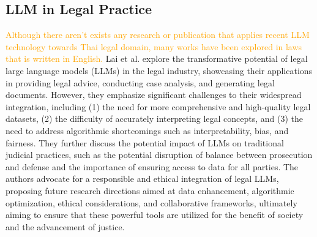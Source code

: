 
\subsection{LLM in Legal Practice}
\label{sec:llminlegal}

\textcolor{orange}{Although there aren't exists any research or publication that applies recent LLM technology towards Thai legal domain, many works have been explored in laws that is written in English.} Lai et al. \cite{LLMlawsurvey} explore the transformative potential of legal large language models (LLMs) in the legal industry, showcasing their applications in providing legal advice, conducting case analysis, and generating legal documents. However, they emphasize significant challenges to their widespread integration, including (1) the need for more comprehensive and high-quality legal datasets, (2) the difficulty of accurately interpreting legal concepts, and (3) the need to address algorithmic shortcomings such as interpretability, bias, and fairness. They further discuss the potential impact of LLMs on traditional judicial practices, such as the potential disruption of balance between prosecution and defense and the importance of ensuring access to data for all parties. The authors advocate for a responsible and ethical integration of legal LLMs, proposing future research directions aimed at data enhancement, algorithmic optimization, ethical considerations, and collaborative frameworks, ultimately aiming to ensure that these powerful tools are utilized for the benefit of society and the advancement of justice.


